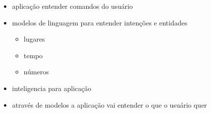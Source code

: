 
\begin{itemize}
	\item aplicação entender comandos do usuário
	\item modelos de linguagem para entender intenções e entidades
		\begin{itemize}
			\item lugares
			\item tempo
			\item números
		\end{itemize}
	\item inteligencia para aplicação
	\item através de modelos a aplicação vai entender o que o usuário quer
\end{itemize}
